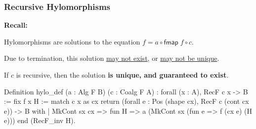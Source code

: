 \begin{frame}[fragile]
  \frametitle{Recursive Hylomorphisms}

  \textbf{Recall:}
\vspace{.2cm}

  Hylomorphisms are solutions to the equation
$f = a \circ \mathsf{fmap}\;f \circ c$.

\vspace{.2cm}
  Due to termination, this solution \ul{may not exist}, or \ul{may not be unique}.

\vspace{.2cm}
  If $c$ is recursive, then the solution \textbf{is unique, and guaranteed to exist}.
\vspace{.4cm}

  \begin{overprint}
    \begin{minipage}{\textwidth}
      \begin{bluebox}
      \begin{coqcode}
Definition hylo_def (a : Alg F B) (c : Coalg F A)
  : forall (x : A), RecF c x -> B :=
  fix f x H :=
    match c x as cx
          return (forall e : Pos (shape cx), RecF c (cont cx e)) -> B
    with
    | MkCont sx cx => fun H => a (MkCont sx (fun e => f (cx e) (H e)))
    end (RecF_inv H).
      \end{coqcode}
      \end{bluebox}
    \end{minipage}
  \end{overprint}

\end{frame}


